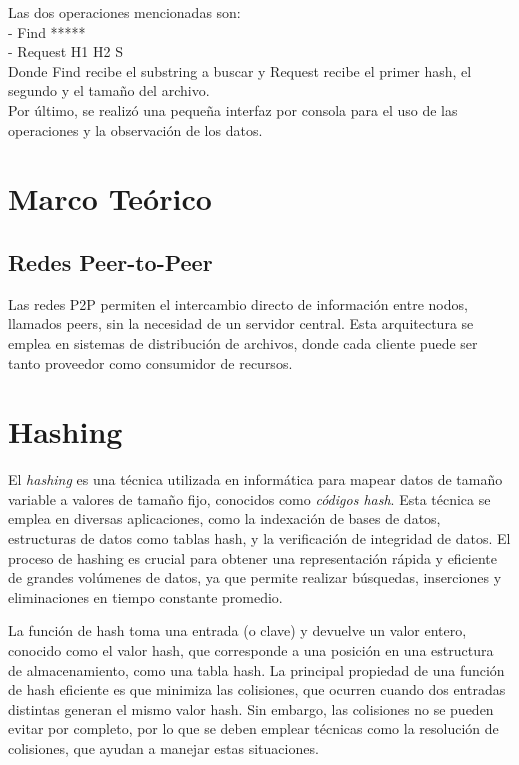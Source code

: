 \documentclass{article}
\begin{document}
Las dos operaciones mencionadas son:\\
- Find *****\\
- Request H1 H2 S\\

Donde Find recibe el substring a buscar y Request recibe el primer hash, el segundo y el tamaño del archivo.\\

Por último, se realizó una pequeña interfaz por consola para el uso de las operaciones y la observación de los datos.\\

\section{Marco Teórico}
\subsection{Redes Peer-to-Peer}
Las redes P2P permiten el intercambio directo de información entre nodos, llamados peers, sin la necesidad de un servidor central. Esta arquitectura se emplea en sistemas de distribución de archivos, donde cada cliente puede ser tanto proveedor como consumidor de recursos.

\section{Hashing}
El \textit{hashing} es una técnica utilizada en informática para mapear datos de tamaño variable a valores de tamaño fijo, conocidos como \textit{códigos hash}. Esta técnica se emplea en diversas aplicaciones, como la indexación de bases de datos, estructuras de datos como tablas hash, y la verificación de integridad de datos. El proceso de hashing es crucial para obtener una representación rápida y eficiente de grandes volúmenes de datos, ya que permite realizar búsquedas, inserciones y eliminaciones en tiempo constante promedio.

La función de hash toma una entrada (o clave) y devuelve un valor entero, conocido como el valor hash, que corresponde a una posición en una estructura de almacenamiento, como una tabla hash. La principal propiedad de una función de hash eficiente es que minimiza las colisiones, que ocurren cuando dos entradas distintas generan el mismo valor hash. Sin embargo, las colisiones no se pueden evitar por completo, por lo que se deben emplear técnicas como la resolución de colisiones, que ayudan a manejar estas situaciones.
\end{document}
